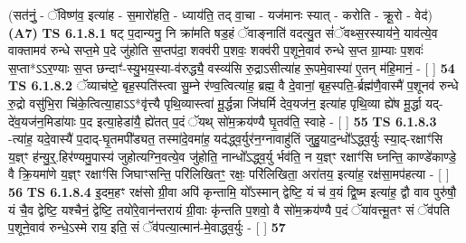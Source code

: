 \documentclass[17pt]{extarticle}
\begin{document}
                  \newline
                      (सत॑नुं॒ - ॅविष्ण॑व॒ इत्या॑ह - स॒मारो॑हति॒ - ध्याय॑ति॒ तद् वा॒चा - यज॑मानः स्यात् - करोति - क्रू॒रो - वेद॑)  \textbf{(A7)} \newline \newline
                                        \textbf{ TS 6.1.8.1} \newline
                  षट् प॒दान्यनु॒ नि क्रा॑मति षड॒हं ॅवाङ्नाति॑ वदत्यु॒त सं॑ॅवथ्स॒रस्याय॑ने॒ याव॑त्ये॒व वाक्तामव॑ रुन्धे सप्त॒मे प॒दे जु॑होति स॒प्तप॑दा॒ शक्व॑री प॒शवः॒ शक्व॑री प॒शूने॒वाव॑ रुन्धे स॒प्त ग्रा॒म्याः प॒शवः॑ स॒प्ता*ऽऽर॒ण्याः स॒प्त छन्दाꣳ॑-स्यु॒भय॒स्या-व॑रुद्ध्यै॒ वस्व्य॑सि रु॒द्राऽसीत्या॑ह रू॒पमे॒वास्या॑ ए॒तन् म॑हि॒मानं॒ - [  ] \textbf{  54} \newline
                  \newline
                                \textbf{ TS 6.1.8.2} \newline
                  ॅव्याच॑ष्टे॒ बृह॒स्पति॑स्त्वा सु॒म्ने र॑ण्व॒त्वित्या॑ह॒ ब्रह्म॒ वै दे॒वानां॒ बृह॒स्पति॒-र्ब्रह्म॑णै॒वास्मै॑ प॒शूनव॑ रुन्धे रु॒द्रो वसु॑भि॒रा चि॑के॒त्वित्या॒हाऽऽ*वृ॑त्त्यै पृथि॒व्यास्त्वा॑ मू॒र्द्धन्ना जि॑घर्मि देव॒यज॑न॒ इत्या॑ह पृथि॒व्या ह्ये॑ष मू॒र्द्धा यद्-दे॑व॒यज॑न॒मिडा॑याः प॒द इत्या॒हेडा॑यै॒ ह्ये॑तत् प॒दं ॅयथ् सो॑म॒क्रय॑ण्यै घृ॒तव॑ति॒ स्वाहे - [  ] \textbf{  55} \newline
                  \newline
                                \textbf{ TS 6.1.8.3} \newline
                  -त्या॑ह॒ यदे॒वास्यै॑ प॒दाद्-घृ॒तमपी᳚ड्यत॒ तस्मा॑दे॒वमा॑ह॒ यद॑द्ध्व॒र्युर॑न॒ग्नावाहु॑तिं जुहु॒याद॒न्धो᳚ऽद्ध्व॒र्युः स्या॒द्-रक्षाꣳ॑सि य॒ज्ञ्ꣳ ह॑न्यु॒र्॒.हिर॑ण्यमु॒पास्य॑ जुहोत्यग्नि॒वत्ये॒व जु॑होति॒ नान्धो᳚ऽद्ध्व॒र्यु र्भव॑ति॒ न य॒ज्ञ्ꣳ रक्षाꣳ॑सि घ्नन्ति॒ काण्डे॑काण्डे॒ वै क्रि॒यमा॑णे य॒ज्ञ्ꣳ रक्षाꣳ॑सि जिघाꣳसन्ति॒ परि॑लिखितꣳ॒॒ रक्षः॒ परि॑लिखिता॒ अरा॑तय॒ इत्या॑ह॒ रक्ष॑सा॒मप॑हत्या - [  ] \textbf{  56} \newline
                  \newline
                                \textbf{ TS 6.1.8.4} \newline
                  इ॒दम॒हꣳ रक्ष॑सो ग्री॒वा अपि॑ कृन्तामि॒ यो᳚ऽस्मान् द्वेष्टि॒ यं च॑ व॒यं द्वि॒ष्म इत्या॑ह॒ द्वौ वाव पुरु॑षौ॒ यं चै॒व द्वेष्टि॒ यश्चैनं॒ द्वेष्टि॒ तयो॑रे॒वान॑न्तरायं ग्री॒वाः कृ॑न्तति प॒शवो॒ वै सो॑म॒क्रय॑ण्यै प॒दं ॅया॑वत्त्मू॒तꣳ सं ॅव॑पति प॒शूने॒वाव॑ रुन्धे॒ऽस्मे राय॒ इति॒ सं ॅव॑पत्या॒त्मान॑-मे॒वाद्ध्व॒र्युः - [  ] \textbf{  57} \newline
\end{document}

